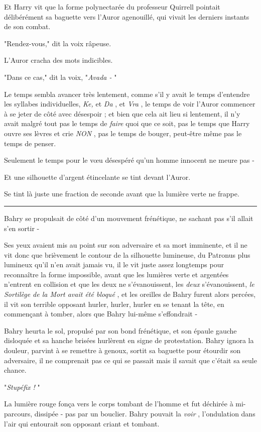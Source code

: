 Et Harry vit que la forme polynectarée du professeur Quirrell pointait délibérément sa baguette vers l'Auror agenouillé, qui vivait les derniers instants de son combat.

"Rendez-vous," dit la voix râpeuse.

L'Auror cracha des mots indicibles.

"Dans ce cas," dit la voix, "\emph{Avada -} "

Le temps sembla avancer très lentement, comme s'il y avait le temps d'entendre les syllabes individuelles, \emph{Ke, } et \emph{Da} , et \emph{Vra} , le temps de voir l'Auror commencer à se jeter de côté avec désespoir ; et bien que cela ait lieu si lentement, il n'y avait malgré tout pas le temps de \emph{faire}  quoi que ce soit, pas le temps que Harry ouvre ses lèvres et crie \emph{NON} , pas le temps de bouger, peut-être même pas le temps de penser.

Seulement le temps pour le vœu désespéré qu'un homme innocent ne meure pas -

Et une silhouette d'argent étincelante se tint devant l'Auror.

Se tint là juste une fraction de seconde avant que la lumière verte ne frappe.
\par\noindent\rule{\textwidth}{0.4pt}
Bahry se propulsait de côté d'un mouvement frénétique, ne sachant pas s'il allait s'en sortir -

Ses yeux avaient mis au point sur son adversaire et sa mort imminente, et il ne vit donc que brièvement le contour de la silhouette lumineuse, du Patronus plus lumineux qu'il n'en avait jamais vu, il le vit juste assez longtemps pour reconnaître la forme impossible, avant que les lumières verte et argentées n'entrent en collision et que les deux ne s'évanouissent, les \emph{deux}  s'évanouissent, \emph{le Sortilège de la Mort avait été bloqué} , et les oreilles de Bahry furent alors percées, il vit son terrible opposant hurler, hurler, hurler en se tenant la tête, en commençant à tomber, alors que Bahry lui-même s'effondrait -

Bahry heurta le sol, propulsé par son bond frénétique, et son épaule gauche disloquée et sa hanche brisées hurlèrent en signe de protestation. Bahry ignora la douleur, parvint à se remettre à genoux, sortit sa baguette pour étourdir son adversaire, il ne comprenait pas ce qui se passait mais il savait que c'était sa seule chance.

"\emph{Stupéfix !} "

La lumière rouge fonça vers le corps tombant de l'homme et fut déchirée à mi-parcours, dissipée - pas par un bouclier. Bahry pouvait la \emph{voir} , l'ondulation dans l'air qui entourait son opposant criant et tombant.

